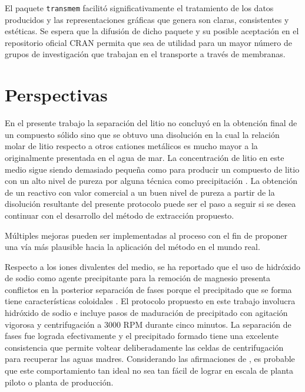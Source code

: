El paquete \verb|transmem| facilitó significativamente el tratamiento de los datos producidos y las repre\-sentaciones gráficas que genera son claras, consistentes y estéticas. Se espera que la difusión de dicho paquete y su posible aceptación en el repositorio oficial \ac{CRAN} permita que sea de utilidad para un mayor número de grupos de investigación que trabajan en el transporte a través de membranas.

\section{Perspectivas}
En el presente trabajo la separación del litio no concluyó en la obtención final de un compuesto sólido sino que se obtuvo una disolución en la cual la relación molar de litio respecto a otros cationes metálicos es mucho mayor a la originalmente presentada en el agua de mar. La concentración de litio en este medio sigue siendo demasiado pequeña como para producir un compuesto de litio con un alto nivel de pureza por alguna técnica como precipitación \citep{Nishihama2011}. La obtención de un reactivo con valor comercial a un buen nivel de pureza a partir de la disolución resultante del presente protocolo puede ser el paso a seguir si se desea continuar con el desarrollo del método de extracción propuesto.

Múltiples mejoras pueden ser implementadas al proceso con el fin de proponer una vía más plausible hacia la aplicación del método en el mundo real.

Respecto a los iones divalentes del medio, se ha reportado que el uso de hidróxido de sodio como agente precipitante para la remoción de magnesio presenta conflictos en la posterior separación de fases porque el precipitado que se forma tiene características coloidales \citep{An2012}. El protocolo propuesto en este trabajo involucra hidróxido de sodio e incluye pasos de maduración de precipitado con agitación vigorosa y centrifugación a 3000 \ac{RPM} durante cinco minutos. La separación de fases fue lograda efectivamente y el precipitado formado tiene una excelente consistencia que permite voltear deliberadamente las celdas de centrifugación para recuperar las aguas madres. Considerando las afirmaciones de \citet{An2012}, es probable que este comportamiento tan ideal no sea tan fácil de lograr en escala de planta piloto o planta de producción. 

